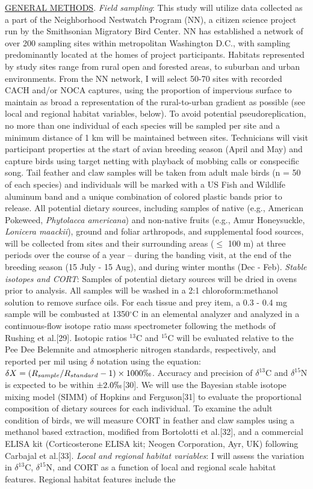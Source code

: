 \documentclass[12pt]{article}
\begin{document}
\noindent \underline{GENERAL METHODS}. \textit {Field sampling}: This study will utilize data collected as a part of the Neighborhood Nestwatch Program (NN), a citizen science project run by the Smithsonian Migratory Bird Center. NN has established a network of over 200 sampling sites within metropolitan Washington D.C., with sampling predominantly located at the homes of project participants. Habitats represented by study sites range from rural open and forested areas, to suburban and urban environments. From the NN network, I will select 50-70 sites with recorded CACH and/or NOCA captures, using the proportion of impervious surface to maintain as broad a representation of the rural-to-urban gradient as possible (see local and regional habitat variables, below). To avoid potential pseudoreplication, no more than one individual of each species will be sampled per site and a minimum distance of 1 km will be maintained between sites. Technicians will visit participant properties at the start of avian breeding season (April and May) and capture birds using target netting with playback of mobbing calls or conspecific song. Tail feather and claw samples will be taken from adult male birds (n = 50 of each species) and individuals will be marked with a US Fish and Wildlife aluminum band and a unique combination of colored plastic bands prior to release. All potential dietary sources, including samples of native  (e.g., American  Pokeweed, \textit {Phytolacca americana}) and non-native fruits (e.g., Amur Honeysuckle, \textit {Lonicera maackii}), ground and foliar arthropods, and supplemental food sources, will be collected from sites and their surrounding areas ($\leq$ 100 m) at three periods over the course of a year -- during the banding visit, at the end of the breeding season (15 July - 15 Aug), and during winter months (Dec - Feb). \textit{Stable isotopes and CORT}: Samples of potential dietary sources will be dried in ovens prior to analysis. All samples will be washed in a 2:1 chloroform:methanol solution to remove surface oils. For each tissue and prey item, a 0.3 - 0.4 mg sample will be combusted at 1350$^{\circ}$C in an elemental analyzer and analyzed in a continuous-flow isotope ratio mass spectrometer following the methods of Rushing et al.[29]. Isotopic ratios $^{13}$C and $^{15}$C will be evaluated relative to the Pee Dee Belemnite and atmospheric nitrogen standards, respectively, and reported per mil using $\delta$ notation using the equation: $\delta{X} = (R_{sample}/R_{standard} -1) \times 1000\permil$. Accuracy and precision of $\delta^{13}$C and $\delta^{15}$N is expected to be within $\pm 2.0 \permil$[30]. We will use the Bayesian stable isotope mixing model (SIMM) of Hopkins and Ferguson[31] to evaluate the proportional composition of dietary sources for each individual. To examine the adult condition of birds, we will measure CORT in feather and claw samples using a methanol based extraction, modified from Bortolotti et al.[32], and a commercial ELISA kit (Corticosterone ELISA kit; Neogen Corporation, Ayr, UK) following Carbajal et al.[33]. \textit{Local and regional habitat variables}: I will assess the variation in $\delta^{13}$C,  $\delta^{15}$N, and CORT as a function of local and regional scale habitat features. Regional habitat features include the 
\end{document}
